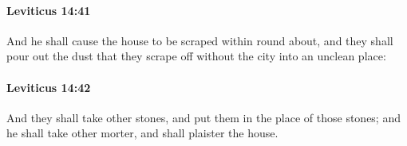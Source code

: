 		\paragraph{Leviticus 14:41} %
			\label{LEVITICUS-14-41}

			And he shall cause the house to be scraped within round about, and they shall pour out the dust that they scrape off without the city into an unclean place:


		\paragraph{Leviticus 14:42} %
			\label{LEVITICUS-14-42}

			And they shall take other stones, and put them in the place of those stones; and he shall take other morter, and shall plaister the house.


